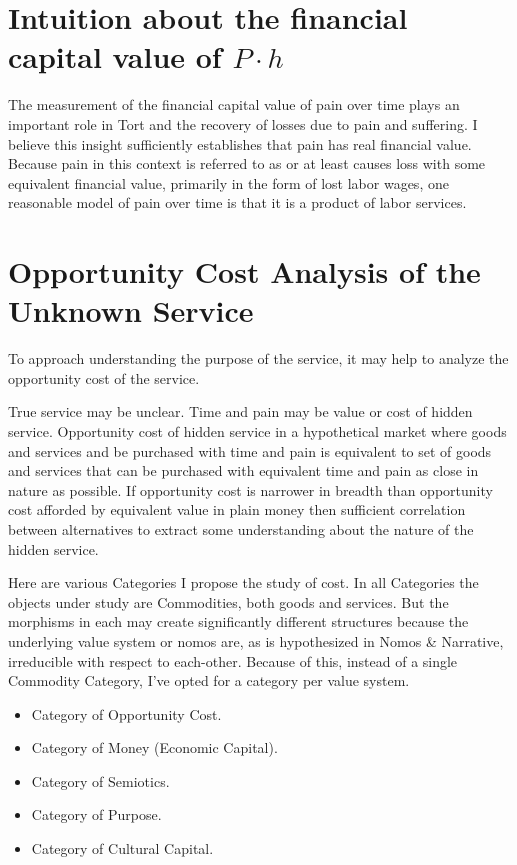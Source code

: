 \documentclass[11pt]{book}
\begin{document}
\section{Intuition about the financial capital value of $P{\cdot}h$}

The measurement of the financial capital value of pain over time plays an important role in Tort and the recovery of losses due to pain and suffering. I believe this insight sufficiently establishes that pain has real financial value. Because pain in this context is referred to as or at least causes loss with some equivalent financial value, primarily in the form of lost labor wages, one reasonable model of pain over time is that it is a product of labor services.

\section{Opportunity Cost Analysis of the Unknown Service}

To approach understanding the purpose of the service, it may help to analyze the opportunity cost of the service.

True service may be unclear. Time and pain may be value or cost of hidden service. Opportunity cost of hidden service in a hypothetical market where goods and services and be purchased with time and pain is equivalent to set of goods and services that can be purchased with equivalent time and pain as close in nature as possible.
If opportunity cost is narrower in breadth than opportunity cost afforded by equivalent value in plain money then sufficient correlation between alternatives to extract some understanding about the nature of the hidden service.

Here are various Categories I propose the study of cost. In all Categories the objects under study are Commodities, both goods and services. But the morphisms in each may create significantly different structures because the underlying value system or nomos are, as is hypothesized in Nomos \& Narrative, irreducible with respect to each-other. Because of this, instead of a single Commodity Category, I've opted for a category per value system.

\begin{itemize}
	\item Category of Opportunity Cost.
	\item Category of Money (Economic Capital).
	\item Category of Semiotics.
	\item Category of Purpose.
	\item Category of Cultural Capital.
\end{itemize}
\end{document}
